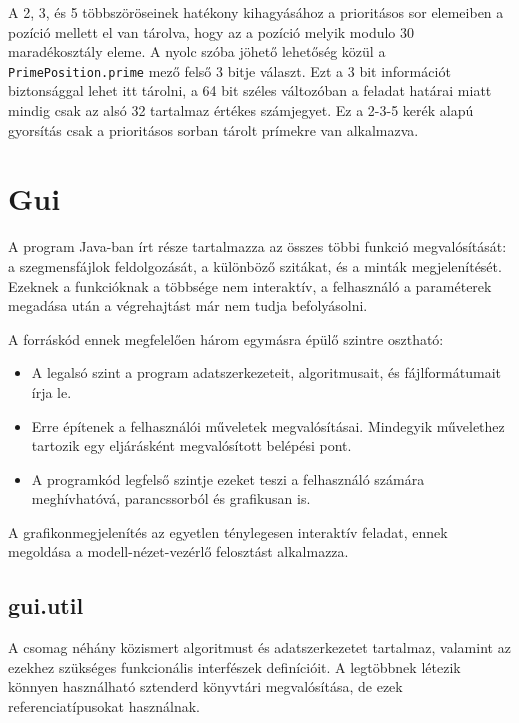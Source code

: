 A 2, 3, és 5 többszöröseinek hatékony kihagyásához a prioritásos sor elemeiben a pozíció mellett el van tárolva, hogy az a pozíció melyik modulo $30$ maradékosztály eleme.
A nyolc szóba jöhető lehetőség közül a \texttt{PrimePosition.prime} mező felső 3 bitje választ.
Ezt a 3 bit információt biztonsággal lehet itt tárolni, a 64 bit széles változóban a feladat határai miatt mindig csak az alsó 32 tartalmaz értékes számjegyet.
Ez a 2-3-5 kerék alapú gyorsítás csak a prioritásos sorban tárolt prímekre van alkalmazva.

\section{Gui}

A program Java-ban írt része tartalmazza az összes többi funkció megvalósítását: a szegmensfájlok feldolgozását, a különböző szitákat, és a minták megjelenítését.
Ezeknek a funkcióknak a többsége nem interaktív, a felhasználó a paraméterek megadása után a végrehajtást már nem tudja befolyásolni.

A forráskód ennek megfelelően három egymásra épülő szintre osztható:
\begin{itemize}
\item A legalsó szint a program adatszerkezeteit, algoritmusait, és fájlformátumait írja le. 
\item Erre építenek a felhasználói műveletek megvalósításai.
Mindegyik művelethez tartozik egy eljárásként megvalósított belépési pont.
\item A programkód legfelső szintje ezeket teszi a felhasználó számára meghívhatóvá, parancssorból és grafikusan is.
\end{itemize}

A grafikonmegjelenítés az egyetlen ténylegesen interaktív feladat, ennek megoldása a modell-nézet-vezérlő felosztást alkalmazza.

\subsection{gui.util}

A csomag néhány közismert algoritmust és adatszerkezetet tartalmaz, valamint az ezekhez szükséges funkcionális interfészek definícióit.
A legtöbbnek létezik könnyen használható sztenderd könyvtári megvalósítása, de ezek referenciatípusokat használnak.

